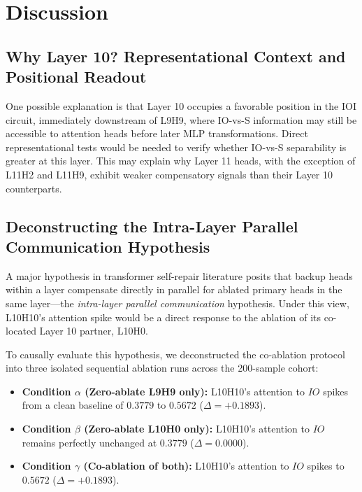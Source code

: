 \documentclass[12pt,a4paper]{article}
\begin{document}
\section{Discussion}
\label{sec:discussion}

\subsection{Why Layer 10? Representational Context and Positional Readout}
\label{subsec:layer10}

One possible explanation is that Layer 10 occupies a favorable position in the IOI circuit, immediately downstream of L9H9, where IO-vs-S information may still be accessible to attention heads before later MLP transformations. Direct representational tests would be needed to verify whether IO-vs-S separability is greater at this layer. This may explain why Layer 11 heads, with the exception of L11H2 and L11H9, exhibit weaker compensatory signals than their Layer 10 counterparts.

\subsection{Deconstructing the Intra-Layer Parallel Communication Hypothesis}
\label{subsec:isolation}

A major hypothesis in transformer self-repair literature posits that backup heads within a layer compensate directly in parallel for ablated primary heads in the same layer—the \emph{intra-layer parallel communication} hypothesis. Under this view, L10H10's attention spike would be a direct response to the ablation of its co-located Layer 10 partner, L10H0. 

To causally evaluate this hypothesis, we deconstructed the co-ablation protocol into three isolated sequential ablation runs across the 200-sample cohort:
\begin{itemize}
  \item \textbf{Condition $\alpha$ (Zero-ablate L9H9 only):} L10H10's attention to $IO$ spikes from a clean baseline of $0.3779$ to $0.5672$ ($\Delta = +0.1893$).
  \item \textbf{Condition $\beta$ (Zero-ablate L10H0 only):} L10H10's attention to $IO$ remains perfectly unchanged at $0.3779$ ($\Delta = 0.0000$).
  \item \textbf{Condition $\gamma$ (Co-ablation of both):} L10H10's attention to $IO$ spikes to $0.5672$ ($\Delta = +0.1893$).
\end{itemize}
\end{document}
